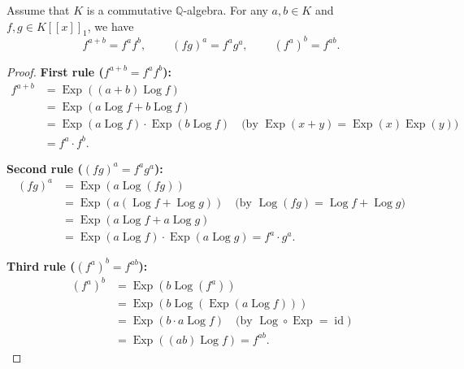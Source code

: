 \begin{theorem}
\label{thm.fps.power-c.rules}
\leantarget
\leanok
Assume that $K$ is a commutative $\mathbb{Q}%
$-algebra. For any $a,b\in K$ and $f,g\in K\left[  \left[  x\right]  \right]
_{1}$, we have
\[
f^{a+b}=f^{a}f^{b},\ \ \ \ \ \ \ \ \ \ \left(  fg\right)  ^{a}=f^{a}%
g^{a},\ \ \ \ \ \ \ \ \ \ \left(  f^{a}\right)  ^{b}=f^{ab}.
\]
\end{theorem}

\begin{proof}
\textbf{First rule ($f^{a+b}=f^af^b$):}
\begin{align*}
f^{a+b} &= \operatorname{Exp}((a+b)\operatorname{Log}f) \\
&= \operatorname{Exp}(a\operatorname{Log}f + b\operatorname{Log}f) \\
&= \operatorname{Exp}(a\operatorname{Log}f)\cdot\operatorname{Exp}(b\operatorname{Log}f)
\quad\text{(by }\operatorname{Exp}(x+y)=\operatorname{Exp}(x)\operatorname{Exp}(y)\text{)} \\
&= f^a \cdot f^b.
\end{align*}

\textbf{Second rule ($(fg)^a = f^a g^a$):}
\begin{align*}
(fg)^a &= \operatorname{Exp}(a\operatorname{Log}(fg)) \\
&= \operatorname{Exp}(a(\operatorname{Log}f + \operatorname{Log}g))
\quad\text{(by }\operatorname{Log}(fg)=\operatorname{Log}f+\operatorname{Log}g\text{)} \\
&= \operatorname{Exp}(a\operatorname{Log}f + a\operatorname{Log}g) \\
&= \operatorname{Exp}(a\operatorname{Log}f)\cdot\operatorname{Exp}(a\operatorname{Log}g)
= f^a\cdot g^a.
\end{align*}

\textbf{Third rule ($(f^a)^b = f^{ab}$):}
\begin{align*}
(f^a)^b &= \operatorname{Exp}(b\operatorname{Log}(f^a)) \\
&= \operatorname{Exp}(b\operatorname{Log}(\operatorname{Exp}(a\operatorname{Log}f))) \\
&= \operatorname{Exp}(b\cdot a\operatorname{Log}f)
\quad\text{(by }\operatorname{Log}\circ\operatorname{Exp} = \operatorname{id}\text{)} \\
&= \operatorname{Exp}((ab)\operatorname{Log}f) = f^{ab}.
\end{align*}
\end{proof}

